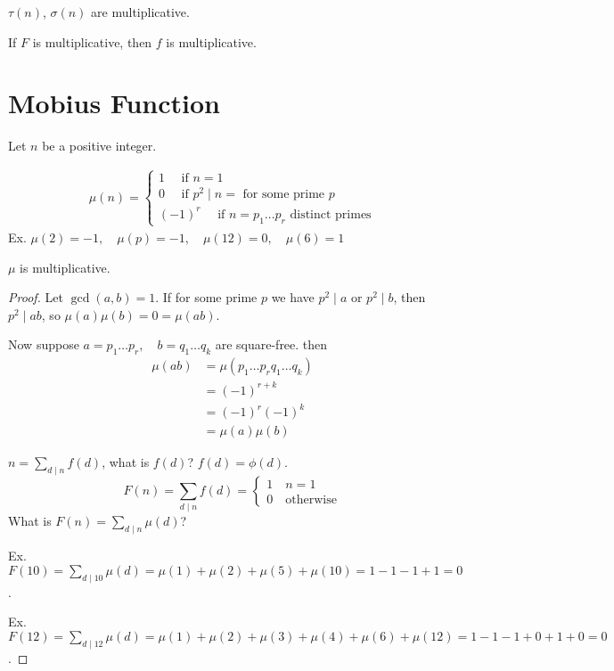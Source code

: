     \begin{corollary}
        $\tau(n)$, $\sigma(n)$ are multiplicative.
    \end{corollary}

    \begin{theorem}
        If $F$ is multiplicative, then $f$ is multiplicative.
    \end{theorem}

\section{Mobius Function}
    Let $n$ be a positive integer. 

    \begin{align*}
        \mu(n) =
        \begin{cases}
            1 \quad\text{ if } n = 1 \\
            0 \quad\text{ if } p^2\mid n = \text{ for some prime } p \\
            (-1)^r \quad\text{ if } n = p_1\dots p_r \text{ distinct primes}
        \end{cases}
    \end{align*}
    Ex. $\mu(2) = -1, \quad\mu(p) = -1, \quad\mu(12) = 0, \quad\mu(6) = 1$

    \begin{theorem}
        $\mu$ is multiplicative. 
        \begin{proof}
            Let $\gcd(a,b) = 1$. If for some prime $p$ we have $p^2\mid a$ or $p^2\mid b$, 
            then $p^2\mid ab$, so $\mu(a)\mu(b) = 0 = \mu(ab)$. 

            Now suppose $a=p_1\dots p_r, \quad b=q_1\dots q_k$ are square-free. then
            \begin{align*}
                \mu(ab) &= \mu(p_1\dots p_r q_1\dots q_k)  \\
                &= (-1)^{r+k} \\
                &= (-1)^r(-1)^k  \\
                &= \mu(a)\mu(b)
            \end{align*}
            
            $n = \sum_{d\mid n}^{} f(d)$, what is $f(d)$? $f(d) = \phi(d)$. 
            \[
                F(n) = \sum_{d\mid n}^{} f(d) = 
                \begin{cases}
                    1 \quad n = 1 \\
                    0 \quad \text{otherwise}
                \end{cases}
            \]
            What is $F(n) = \sum_{d\mid n}^{} \mu(d)$?

            Ex. $F(10) = \sum_{d\mid 10}^{} \mu(d) = \mu(1) + \mu(2) + \mu(5) + \mu(10) = 1-1-1+1 = 0$.

            Ex. $F(12) = \sum_{d\mid 12}^{} \mu(d) = \mu(1) + \mu(2) + \mu(3) + \mu(4) + \mu(6) + \mu(12) = 1-1-1+0+1+0 = 0$.

        \end{proof}
    \end{theorem}

